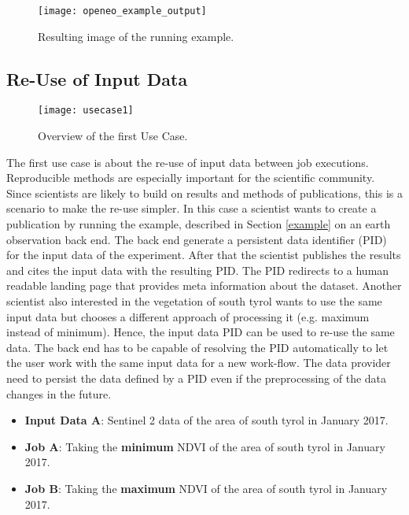 \documentclass[draft,final]{vutinfth} %
\begin{document}
\begin{figure}[h]
	\centering
	\texttt{[image: openeo\_example\_output]}
	\caption{Resulting image of the running example.}
	\label{fig:example} %
\end{figure}


\subsection{Re-Use of Input Data}\label{UseCase1}
\begin{figure}[h]
	\centering
	\texttt{[image: usecase1]}
	\caption{Overview of the first Use Case.}
	\label{fig:usecase1} %
\end{figure}
The first use case is about the re-use of input data between job executions. Reproducible methods are especially important for the scientific community. Since scientists are likely to build on results and methods of publications, this is a scenario to make the re-use simpler. In this case a scientist wants to create a publication by running the example, described in Section \ref{example} on an earth observation back end. The back end generate a persistent data identifier (PID) for the input data of the experiment. After that the scientist publishes the results and cites the input data with the resulting PID. The PID redirects to a human readable landing page that provides meta information about the dataset. Another scientist also interested in the vegetation of south tyrol wants to use the same input data but chooses a different approach of processing it (e.g. maximum instead of minimum). Hence, the input data PID can be used to re-use the same data. The back end has to be capable of resolving the PID automatically to let the user work with the same input data for a new work-flow. The data provider need to persist the data defined by a PID even if the preprocessing of the data changes in the future.    

\begin{itemize}
	\item \textbf{Input Data A}: Sentinel 2 data of the area of south tyrol in January 2017. 
	\item \textbf{Job A}: Taking the \textbf{minimum} NDVI of the area of south tyrol in January 2017. 
	\item \textbf{Job B}: Taking the \textbf{maximum} NDVI of the area of south tyrol in January 2017.
\end{itemize}
\end{document}

